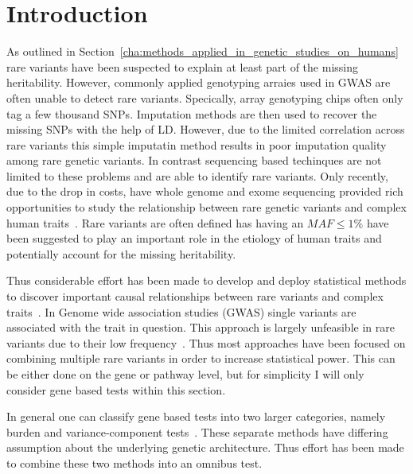 \section{Introduction}
\label{sec:introduction}

As outlined in Section~\ref{cha:methods_applied_in_genetic_studies_on_humans} rare variants have been suspected to explain at least part of the missing heritability.
However, commonly applied genotyping arraies used in GWAS are often unable to detect rare variants.
Specically, array genotyping chips often only tag a few thousand SNPs.
Imputation methods are then used to recover the missing SNPs with the help of LD.
However, due to the limited correlation across rare variants this simple imputatin method results in poor imputation quality among rare genetic variants.
In contrast sequencing based techinques are not limited to these problems and are able to identify rare variants.
Only recently, due to the drop in costs, have whole genome and exome sequencing provided rich opportunities to study the relationship between rare genetic variants and complex human traits~\cite{Goodwin2016}.
Rare variants are often defined has having an $MAF\leq 1\%$ have been suggested to play an important role in the etiology of human traits and potentially account for the missing heritability\cite{Jiang2013,Li2009a}.

Thus considerable effort has been made to develop and deploy statistical methods to discover important causal relationships between rare variants and complex traits~\cite{Morris2010,Zeng2014,Daye2012,Manuscript2013}.
In Genome wide association studies (GWAS) single variants are associated with the trait in question.
This approach is largely unfeasible in rare variants due to their low frequency~\cite{Lee2014}.
Thus most approaches have been focused on combining multiple rare variants in order to increase statistical power.
This can be either done on the gene or pathway level, but for simplicity I will only consider gene based tests within this section.

In general one can classify gene based tests into two larger categories, namely burden and variance-component tests~\cite{Lee2014}.
These separate methods have differing assumption about the underlying genetic architecture.
Thus effort has been made to combine these two methods into an omnibus test.

